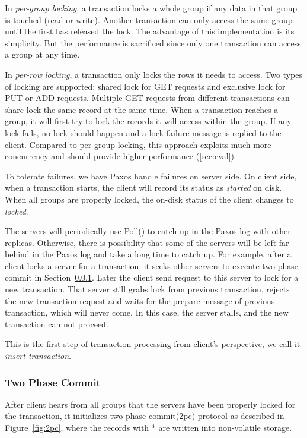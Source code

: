 \documentclass{vldb}
\begin{document}
In \textit{per-group locking}, a transaction locks a whole group if 
any data in that group is touched (read or write). Another transaction 
can only access the same group until the first has released the lock.  
The advantage of this implementation is its simplicity. But the 
performance is sacrificed since only one transaction can access a 
group at any time. 

In \textit{per-row locking}, a transaction only locks the rows it 
needs to access. Two types of locking are supported: shared lock for 
GET requests and exclusive lock for PUT or ADD requests. Multiple GET 
requests from different transactions can share lock the same record at 
the same time. When a transaction reaches a group, it will first try 
to lock the records it will access within the group. If any lock 
fails, no lock should happen and a lock failure message is replied to 
the client. Compared to per-group locking, this approach exploits much 
more concurrency and should provide higher performance 
(\cref{sec:eval})

To tolerate failures, we have Paxos handle failures on server side. On 
client side, when a transaction starts, the client will record its 
status as \textit{started} on disk. When all groups are properly 
locked, the on-disk status of the client changes to \textit{locked}.

The servers will periodically use Poll() to catch up in the Paxos log 
with other replicas. Otherwise, there is possibility that some of the 
servers will be left far behind in the Paxos log and take a long time 
to catch up. For example, after a client locks a server for a 
transaction, it seeks other servers to execute two phase commit in
Section~\ref{sec:2pc}. Later the client send request to this server to 
lock for a new transaction. That server still grabs lock from previous 
transaction, rejects the new transaction request and waits for the 
prepare message of previous transaction, which will never come. In 
this case, the server stalls, and the new transaction can not
proceed.

This is the first step of transaction processing from client's 
perspective, we call it \textit{insert transaction}.

\subsubsection{Two Phase Commit}
\label{sec:2pc}

After client hears from all groups that the servers have been properly 
locked for the transaction, it initializes two-phase commit(2pc) 
protocol as described in Figure~\ref{fig:2pc}, where the records with 
* are written into non-volatile storage.
\end{document}
